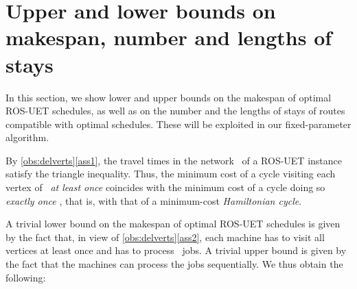 \documentclass[natbib,sort,smallextended,envcountsame,envcountsect,numbook]{svjour3}
\newcommand{\ROSUPT}{\textsc{ROS-UET}}
\begin{document}
\section{Upper and lower bounds on makespan, number and lengths of stays}\label{sec:ubo}
\noindent
In this section,
we show lower and upper bounds on the makespan
of optimal \ROSUPT{} schedules,
as well as
on the number and the lengths of stays
of routes compatible with optimal schedules.
These will be exploited
in our fixed-parameter algorithm.


By \cref{obs:delverts}\eqref{ass1},
the travel times in the network~ of a \ROSUPT{} instance
satisfy the triangle inequality.
Thus, the minimum cost of a cycle
visiting each vertex of~ \emph{at least once}
coincides with the minimum cost of a cycle
doing so \emph{exactly once} \citep{Ser78},
that is, with that of a minimum-cost \emph{Hamiltonian cycle}.

A trivial lower bound
on the makespan of optimal \ROSUPT{} schedules
is given by the fact that,
in view of \cref{obs:delverts}\eqref{ass2},
each machine has to visit
all vertices at least once
and has to process ~jobs.
A trivial upper bound is given by
the fact that the machines can process the jobs sequentially.
We thus obtain the following:
\end{document}
